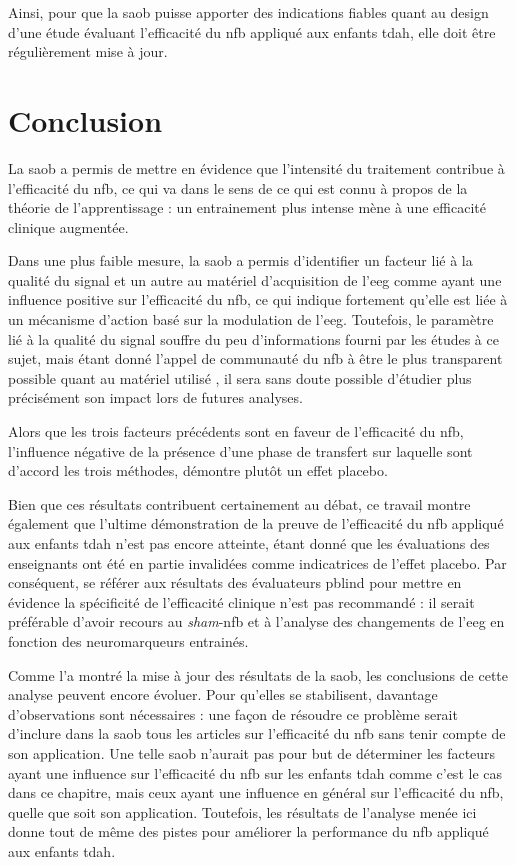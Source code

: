 Ainsi, pour que la \gls{saob} puisse apporter des indications fiables quant au design d'une étude évaluant l'efficacité du \gls{nfb} appliqué aux enfants \gls{tdah}, elle doit être 
régulièrement mise à jour. 

\section{Conclusion} \label{conclusion_saob}

La \gls{saob} a permis de mettre en évidence que l'intensité du traitement contribue à l'efficacité du \gls{nfb}, ce qui va dans le sens de ce qui est connu à propos de 
la théorie de l'apprentissage \citep{Mowrer1960} : un entrainement plus intense mène à une efficacité clinique augmentée. 

Dans une plus faible mesure, la \gls{saob} a permis d'identifier un facteur lié à la qualité du signal et un autre au matériel d'acquisition de l'\gls{eeg} comme ayant une influence positive 
sur l'efficacité du \gls{nfb}, ce qui indique fortement qu'elle est liée à un mécanisme d'action basé sur la modulation de l'\gls{eeg}. Toutefois, le paramètre lié à la qualité du signal 
souffre du peu d'informations fourni par les études à ce sujet, mais étant donné l'appel de
communauté du \gls{nfb} à être le plus transparent possible quant au matériel utilisé \citep{Ros2019}, il sera sans doute possible d'étudier plus précisément
son impact lors de futures analyses.

Alors que les trois facteurs précédents sont en faveur de l'efficacité du \gls{nfb}, l'influence négative de la présence d'une phase de transfert sur laquelle sont d'accord les trois méthodes, 
démontre plutôt un effet placebo. 

Bien que ces résultats contribuent certainement au débat, ce travail montre également que l'ultime démonstration de la preuve de l'efficacité du \gls{nfb}
appliqué aux enfants \gls{tdah} n'est pas encore atteinte, étant donné que les évaluations des enseignants ont été en partie invalidées comme indicatrices de 
l'effet placebo. Par conséquent, se référer aux résultats des évaluateurs \gls{pblind} pour mettre en évidence la spécificité de l'efficacité clinique n'est pas 
recommandé : il serait préférable d'avoir recours au \textit{sham}-\gls{nfb} et à l'analyse des changements de l'\gls{eeg} en fonction des neuromarqueurs entrainés.

Comme l'a montré la mise à jour des résultats de la \gls{saob}, les conclusions de cette analyse peuvent encore évoluer. Pour qu'elles se stabilisent, 
davantage d'observations sont nécessaires : une façon de résoudre ce problème serait d'inclure dans la \gls{saob} tous les articles sur l'efficacité du 
\gls{nfb} sans tenir compte de son application. Une telle \gls{saob} n'aurait pas pour but de déterminer les facteurs ayant une influence sur 
l'efficacité du \gls{nfb} sur les enfants \gls{tdah} comme c'est le cas dans ce chapitre, mais ceux ayant une influence en général sur 
l'efficacité du \gls{nfb}, quelle que soit son application. Toutefois, les résultats de l'analyse menée ici donne tout de même des pistes pour améliorer 
la performance du \gls{nfb} appliqué aux enfants \gls{tdah}. 

